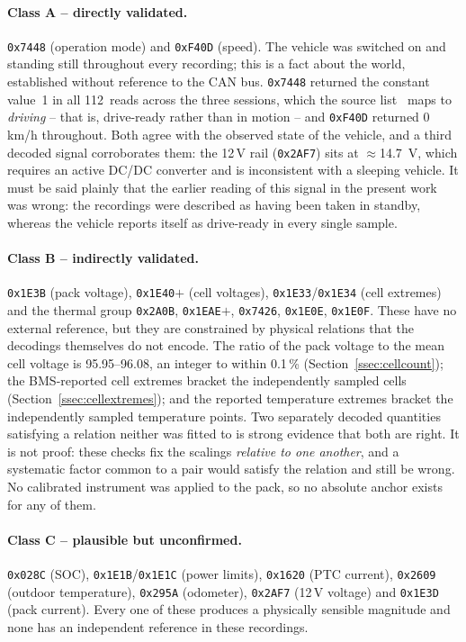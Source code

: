 \documentclass[11pt,a4paper,oneside,parskip=half]{scrreprt}
\providecommand{\hex}{}\renewcommand{\hex}[1]{\texttt{0x#1}}
\begin{document}
\paragraph{Class A -- directly validated.} \hex{7448} (operation mode) and \hex{F40D} (speed). The vehicle was switched on and standing still throughout every recording; this is a fact about the world, established without reference to the CAN bus. \hex{7448} returned the constant value~1 in all 112~reads across the three sessions, which the source list~\cite{vwmebpidlist} maps to \emph{driving} -- that is, drive-ready rather than in motion -- and \hex{F40D} returned 0\,km/h throughout. Both agree with the observed state of the vehicle, and a third decoded signal corroborates them: the 12\,V rail (\hex{2AF7}) sits at $\approx$14.7~V, which requires an active DC/DC converter and is inconsistent with a sleeping vehicle. It must be said plainly that the earlier reading of this signal in the present work was wrong: the recordings were described as having been taken in standby, whereas the vehicle reports itself as drive-ready in every single sample.

\paragraph{Class B -- indirectly validated.} \hex{1E3B} (pack voltage), \hex{1E40}$+$ (cell voltages), \hex{1E33}/\hex{1E34} (cell extremes) and the thermal group \hex{2A0B}, \hex{1EAE}$+$, \hex{7426}, \hex{1E0E}, \hex{1E0F}. These have no external reference, but they are constrained by physical relations that the decodings themselves do not encode. The ratio of the pack voltage to the mean cell voltage is 95.95--96.08, an integer to within 0.1\,\% (Section~\ref{ssec:cellcount}); the BMS-reported cell extremes bracket the independently sampled cells (Section~\ref{ssec:cellextremes}); and the reported temperature extremes bracket the independently sampled temperature points. Two separately decoded quantities satisfying a relation neither was fitted to is strong evidence that both are right. It is not proof: these checks fix the scalings \emph{relative to one another}, and a systematic factor common to a pair would satisfy the relation and still be wrong. No calibrated instrument was applied to the pack, so no absolute anchor exists for any of them.

\paragraph{Class C -- plausible but unconfirmed.} \hex{028C} (SOC), \hex{1E1B}/\hex{1E1C} (power limits), \hex{1620} (PTC current), \hex{2609} (outdoor temperature), \hex{295A} (odometer), \hex{2AF7} (12\,V voltage) and \hex{1E3D} (pack current). Every one of these produces a physically sensible magnitude and none has an independent reference in these recordings.
\end{document}

